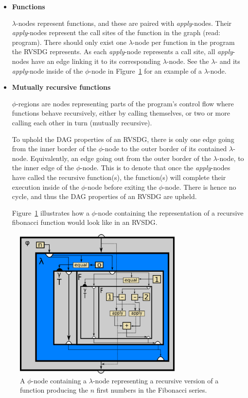 \begin{itemize}
\item \textbf{Functions}

\textit{$\lambda$}-nodes represent functions, and these are paired with
\textit{apply}-nodes. Their \textit{apply}-nodes represent the call sites of the
function in the graph (read: program). There should only exist one
$\lambda$-node per function in the program the RVSDG represents. As each
\textit{apply}-node represents a call site, all \textit{apply}-nodes have an
edge linking it to its corresponding $\lambda$-node. See the $\lambda$- and its
\textit{apply}-node inside of the $\phi$-node in Fĩgure~\ref{fig:rec_fib_phi}
for an example of a $\lambda$-node.

\item \textbf{Mutually recursive functions}

\textit{$\phi$}-regions are nodes representing parts of the program's control
flow where functions behave recursively, either by calling themselves, or two or
more calling each other in turn (mutually recursive).

To uphold the DAG properties of an RVSDG, there is only one edge going from the
inner border of the $\phi$-node to the outer border of its contained
$\lambda$-node. Equivalently, an edge going out from the outer border of the
$\lambda$-node, to the inner edge of the $\phi$-node. This is to denote that
once the \textit{apply}-nodes have called the recursive function(s), the
function(s) will complete their execution inside of the $\phi$-node before
exiting the $\phi$-node. There is hence no cycle, and thus the DAG properties of
an RVSDG are upheld.

Figure~\ref{fig:rec_fib_phi} illustrates how a $\phi$-node containing the
representation of a recursive fibonacci function would look like in an RVSDG.

\end{itemize}

\begin{figure}[h]
	\centering
	\includegraphics[width=0.75\textwidth]{figures/recursive_fibonacci}
	\caption{A $\phi$-node containing a $\lambda$-node representing a recursive
version of a function producing the $n$ first numbers in the Fibonacci series.}
	\label{fig:rec_fib_phi}
\end{figure}
